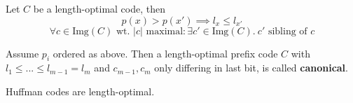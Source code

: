 Let \(C\) be a length-optimal code, then 
\[p(x) > p(x') \implies l_x \leq l_{x'}\]
\[\forall c \in \text{Img}(C) \text{ wt. } |c| \text{ maximal}: \exists c' \in \text{Img}(C). \ c' \text{ sibling of }c \]

Assume \(p_i\) ordered as above. Then a length-optimal prefix code \(C\) with 
\(l_1 \leq ...\leq l_{m-1} = l_m\) and \(c_{m-1}, c_m\) only differing in last bit, is called \textbf{canonical}.

Huffman codes are length-optimal.
